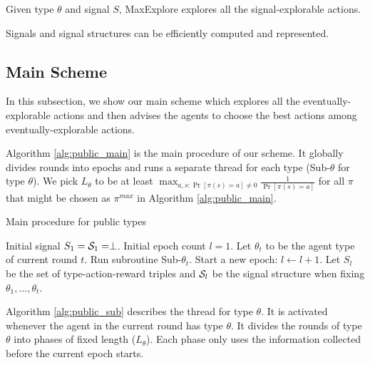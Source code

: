 \begin{claim}
\label{clm:maxexplore}
Given type $\theta$ and signal $S$, MaxExplore explores all the signal-explorable actions.
\end{claim}

\begin{claim}
Signals and signal structures can be efficiently computed and represented.
\end{claim}

\subsection{Main Scheme}
\label{sec:public_main}
In this subsection, we show our main scheme which explores all the eventually-explorable actions and then advises the agents to choose the best actions among eventually-explorable actions.

Algorithm \ref{alg:public_main} is the main procedure of our scheme. It globally divides rounds into epochs and runs a separate thread for each type (Sub-$\theta$ for type $\theta$). We pick $L_{\theta}$ to be at least $\max_{a,s: \Pr[\pi(s)=a] \neq 0} \frac{1}{\Pr[\pi(s)=a]}$ for all $\pi$ that might be chosen as $\pi^{max}$ in Algorithm \ref{alg:public_main}.
 \begin{algorithm}[H]
    \caption{Main procedure for public types }
    	\label{alg:public_main}
    \begin{algorithmic}[1]
    	\STATE Initial signal $S_1 = \S_1 = \perp$.
	\STATE Initial epoch count $l = 1$.
		\STATE Let $\theta_t$ to be the agent type of current round $t$. Run subroutine Sub-$\theta_t$.
			\STATE Start a new epoch:
			\STATE $l \leftarrow l + 1$.
			\STATE Let $S_l$ be the set of type-action-reward triples and $\S_l$ be the signal structure when fixing $\theta_1,...,\theta_t$.
		\ENDIF
	\ENDFOR
     \end{algorithmic}
\end{algorithm}

Algorithm \ref{alg:public_sub} describes the thread for type $\theta$. It is activated whenever the agent in the current round has type $\theta$. It divides the rounds of type $\theta$ into phases of fixed length ($L_{\theta}$). Each phase only uses the information collected before the current epoch starts.

